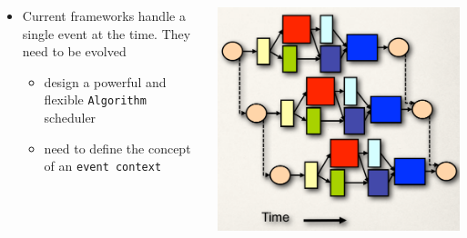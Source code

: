 \documentclass[10pt]{beamer}
\begin{document}
{\begin{columns}
\begin{column}{0.7\textwidth}
\begin{block}{}
\begin{itemize}
            \item Current frameworks handle a single event at the
              time. They need to be evolved
              \begin{itemize}
                \item design a powerful and flexible
                  \texttt{Algorithm} scheduler
                \item need to define the concept of an \texttt{event context}
              \end{itemize}
        \end{itemize}
      \end{block}
    \end{column}
    \begin{column}{0.3\textwidth}
      \includegraphics[width=1\textwidth]{figs/gaudi-hive-2.png}
    \end{column}
  \end{columns}

}
\end{document}
